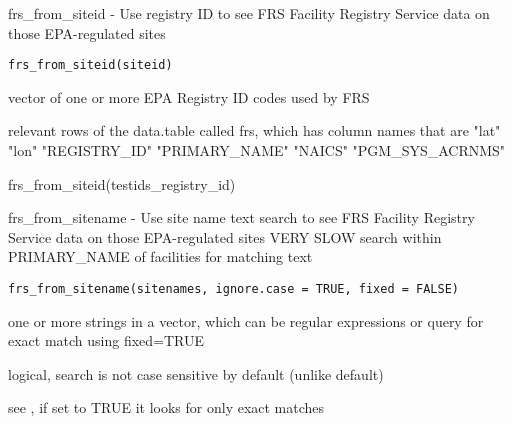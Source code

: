 \documentclass[a4paper]{book}
\begin{document}
%
\begin{Description}\relax
frs\_from\_siteid - Use registry ID to see FRS Facility Registry Service data on those EPA-regulated sites
\end{Description}
%
\begin{Usage}
\begin{verbatim}
frs_from_siteid(siteid)
\end{verbatim}
\end{Usage}
%
\begin{Arguments}
\begin{ldescription}
\item[\code{siteid}] vector of one or more EPA Registry ID codes used by FRS
\end{ldescription}
\end{Arguments}
%
\begin{Value}
relevant rows of the data.table called frs, which has column names that are
"lat" "lon" "REGISTRY\_ID" "PRIMARY\_NAME" "NAICS" "PGM\_SYS\_ACRNMS"
\end{Value}
%
\begin{Examples}
\begin{ExampleCode}
frs_from_siteid(testids_registry_id)
\end{ExampleCode}
\end{Examples}
%
\begin{Description}\relax
frs\_from\_sitename - Use site name text search to see FRS Facility Registry Service data on those EPA-regulated sites
VERY SLOW search within PRIMARY\_NAME of facilities for matching text
\end{Description}
%
\begin{Usage}
\begin{verbatim}
frs_from_sitename(sitenames, ignore.case = TRUE, fixed = FALSE)
\end{verbatim}
\end{Usage}
%
\begin{Arguments}
\begin{ldescription}
\item[\code{sitenames}] one or more strings in a vector, which can be regular expressions or query for exact match using fixed=TRUE

\item[\code{ignore.case}] logical, search is not case sensitive by default (unlike  default)

\item[\code{fixed}] see , if set to TRUE it looks for only exact matches
\end{ldescription}
\end{Arguments}
\end{document}

